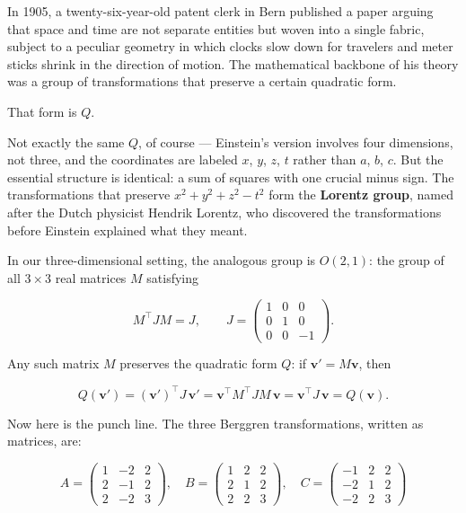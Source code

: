 In 1905, a twenty-six-year-old patent clerk in Bern published a paper arguing that space and time are not separate entities but woven into a single fabric, subject to a peculiar geometry in which clocks slow down for travelers and meter sticks shrink in the direction of motion. The mathematical backbone of his theory was a group of transformations that preserve a certain quadratic form.

That form is $Q$.

Not exactly the same $Q$, of course --- Einstein's version involves four dimensions, not three, and the coordinates are labeled $x$, $y$, $z$, $t$ rather than $a$, $b$, $c$. But the essential structure is identical: a sum of squares with one crucial minus sign. The transformations that preserve $x^2 + y^2 + z^2 - t^2$ form the \textbf{Lorentz group}, named after the Dutch physicist Hendrik Lorentz, who discovered the transformations before Einstein explained what they meant.

In our three-dimensional setting, the analogous group is $O(2,1)$: the group of all $3 \times 3$ real matrices $M$ satisfying

\[M^\top J M = J, \qquad J = \begin{pmatrix} 1 & 0 & 0 \\ 0 & 1 & 0 \\ 0 & 0 & -1 \end{pmatrix}.\]

Any such matrix $M$ preserves the quadratic form $Q$: if $\mathbf{v}' = M\mathbf{v}$, then

\[Q(\mathbf{v}') = (\mathbf{v}')^\top J\, \mathbf{v}' = \mathbf{v}^\top M^\top J M\, \mathbf{v} = \mathbf{v}^\top J\, \mathbf{v} = Q(\mathbf{v}).\]

Now here is the punch line. The three Berggren transformations, written as matrices, are:

\[A = \begin{pmatrix} 1 & -2 & 2 \\ 2 & -1 & 2 \\ 2 & -2 & 3 \end{pmatrix}, \quad B = \begin{pmatrix} 1 & 2 & 2 \\ 2 & 1 & 2 \\ 2 & 2 & 3 \end{pmatrix}, \quad C = \begin{pmatrix} -1 & 2 & 2 \\ -2 & 1 & 2 \\ -2 & 2 & 3 \end{pmatrix}\]

